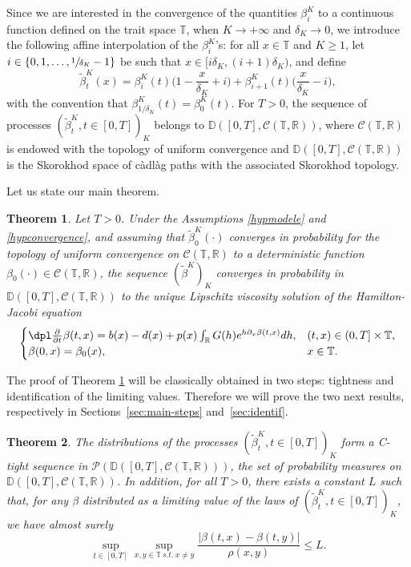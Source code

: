 \documentclass[JEP,XML,SOM,Unicode,published]{cedram}
\let\cal\mathcal
\let\f\frac
\theoremstyle{plain}
\newtheorem{theorem}{Theorem}[section]
\theoremstyle{remark}
\newcommand{\Co}{\mathcal{C}}
\newcommand\T{\mathbb{T}}
\newcommand\R{\mathbb{R}}
\begin{document}
\par Since we are interested in the convergence of the quantities $\beta_i^K$ to a continuous function defined on the trait space $\T$, when $K\to+\infty$ and $\delta_K \to 0$, we introduce the following affine interpolation of the $\beta_i^K$'s:
for all $x\in\T$ and $K\geq 1$, let $i\in \{0, 1,\dots, \sfrac{1}{\delta_K}-1\}$ be such that $x\in [i\delta_K,(i+1)\delta_K)$, and define
\begin{equation}
\label{lafonction}
\widetilde \beta^K_{t}(x) =\beta_i^K(t)\Big(1-\f {x}{\delta_K}+i\Big)+\beta_{i+1}^K(t)\Big(\f {x}{\delta_K}-i\Big),
\end{equation}
with the convention that $\beta^K_{1/\delta_K}(t)=\beta^K_0(t)$.
For $T>0$, the sequence of processes $(\widetilde \beta^K_{t}, t\in[0,T])_{K}$ belongs to $\mathbb{D}([0,T], \Co(\T,\mathbb{R}))$, where $\Co(\T,\mathbb{R})$ is endowed with the topology of uniform convergence and $\mathbb{D}([0,T], \Co(\T,\mathbb{R}))$ is the Skorokhod space of càdlàg paths with the associated Skorokhod topology.

Let us state our main theorem.

\begin{theorem}\label{thm:main}
Let $T>0$. Under the Assumptions \ref{hypmodele} and \ref{hypconvergence}, and assuming that $\widetilde{\beta}^K_0(\cdot)$ converges in probability for the topology of uniform convergence on $\Co(\T,\mathbb{R})$ to a deterministic function $\beta_0(\cdot)\in \Co(\T,\mathbb{R})$,
the sequence $(\widetilde{\beta}^K)_K$ converges in probability in $\mathbb{D}([0,T], \Co(\T,\mathbb{R}))$ to the unique Lipschitz viscosity solution of the Hamilton-Jacobi equation
\begin{equation}
\label{eq:HJ}
\begin{cases}
\dpl\frac{\partial}{\partial t} \beta(t,x)=b(x)-d(x)+ p(x) \int_{\R} G(h)e^{h\partial_x \beta(t,x)} dh, & (t,x)\in (0,T]\times \T, \\
\beta(0,x)=\beta_0(x), & x\in \T.
\end{cases}
\end{equation}
\end{theorem}

The proof of Theorem \ref{thm:main} will be classically obtained in two steps: tightness and identification of the limiting values. Therefore we will prove the two next results, respectively in Sections~\ref{sec:main-steps} and~\ref{sec:identif}.

\begin{theorem}
\label{thm:tight}
The distributions of the processes $(\widetilde \beta^K_{t}, t\in[0,T])_{K}$ form a C-tight sequence in ${\cal P}(\mathbb{D}([0,T], \Co(\T,\mathbb{R})))$, the set of probability measures on $\mathbb{D}([0,T], \Co(\T,\mathbb{R}))$. In addition, for all $T>0$, there exists a constant $L$ such that, for any $\beta$ distributed as a limiting value of the laws of $(\widetilde \beta^K_{t}, t\in[0,T])_{K}$, we have almost surely
\begin{equation}
\label{eq:Lipschitz-estimate}
\sup_{t\in[0,T]}\sup_{x,y\in\T\ s.t.\ x\neq y}\frac{|\beta(t,x)-\beta(t,y)|}{\rho(x,y)}\leq L.
\end{equation}
\end{theorem}
\end{document}

